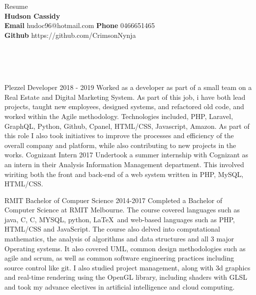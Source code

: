 \documentclass[9pt]{developercv}
\newcommand{\CC}{C\nolinebreak\hspace{-.05em}\raisebox{.4ex}{\tiny\bf +}\nolinebreak\hspace{-.10em}\raisebox{.4ex}{\tiny\bf +}}
\def\CC{{C\nolinebreak[4]\hspace{-.05em}\raisebox{.4ex}{\tiny\bf ++}}}
\begin{document}
	\begin{minipage}[a]{1.0\textwidth}
		\begin{center}
			{\HUGE Resume}\\
			\textbf {Hudson Cassidy} \\
			\textbf {Email} hudoc96@hotmail.com
			\textbf {Phone} 0466651465 \\
			\textbf {Github} https://github.com/CrimsonNynja \\
		\end{center}
	\end{minipage}
	\\
	\\
	\\
	\begin{minipage}[t]{0.6\textwidth}
		\begin{entrylist}
			\entry
				{Plezzel}
				{Developer}
				{2018 - 2019}
				{Worked as a developer as part of a small team on a Real Estate and Digital Marketing System. As part of this job, i have both lead projects, taught new employees, designed systems, and refactored old code, and worked within the Agile methodology. Technologies included, PHP, Laravel, GraphQL, Python, Github, Cpanel, HTML/CSS, Javascript, Amazon. As part of this role I also took initiatives to improve the processes and efficiency of the overall company and platform, while also contributing to new projects in the works.}
			\entry
				{Cognizant}
				{Intern}
				{2017}
				{Undertook a summer internship with Cognizant as an intern in their Analysis Information Management department. This involved wiriting both the front and back-end of a web system written in PHP, MySQL, HTML/CSS.}
		\end{entrylist}	
		\cvsect{Education}
		\begin{entrylist}
			\entry
				{RMIT}
				{Bachelor of Compuer Science}
				{2014-2017}
				{Completed a Bachelor of Computer Science at RMIT Melbourne. The course covered languages such as java, C, \CC, MYSQL, python, \LaTeX  \  and web-based languages such as PHP, HTML/CSS and JavaScript. The course also delved into computational mathematics, the analysis of algorithms and data structures and all 3 major Operating systems. It also covered UML, common design methodologies such as agile and scrum, as well as common software engineering practices including source control like git. I also studied project management, along with 3d graphics and real-time rendering using the OpenGL library, including shaders with GLSL and took my advance electives in artificial intelligence and cloud computing.}

\end{entrylist}
\end{minipage}
\end{document}
